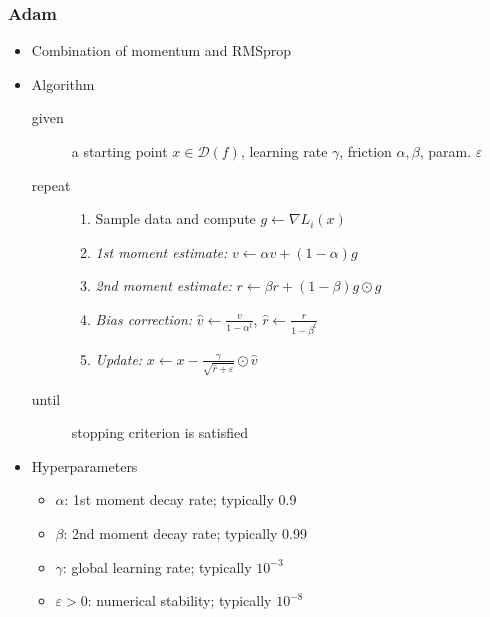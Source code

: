 \subsubsection*{Adam}
\begin{itemize}
    \item Combination of momentum and RMSprop
    \item Algorithm
    \begin{description}
        \item[given] a starting point $x\in\mathcal{D}(f)$, learning rate $\gamma$, friction $\alpha,\beta$, param. $\varepsilon$
        \item[repeat] \phantom{}
        \begin{enumerate}
            \item Sample data and compute $g\leftarrow\nabla L_i(x)$
            \item \textit{1st moment estimate:} $v\leftarrow\alpha v+(1-\alpha)g$
            \item \textit{2nd moment estimate:} $r\leftarrow\beta r+(1-\beta)g\odot g$
            \item \textit{Bias correction:} $\hat{v}\leftarrow\frac{v}{1-\alpha^t}$, $\hat{r}\leftarrow\frac{r}{1-\beta^t}$
            \item \textit{Update:} $x\leftarrow x-\frac{\gamma}{\sqrt{\hat{r}+\varepsilon}}\odot\hat{v}$
        \end{enumerate}
        \item[until] stopping criterion is satisfied
    \end{description}
    \item Hyperparameters
    \begin{itemize}
        \item $\alpha$: 1st moment decay rate; typically 0.9
        \item $\beta$: 2nd moment decay rate; typically 0.99
        \item $\gamma$: global learning rate; typically $10^{-3}$
        \item $\varepsilon>0$: numerical stability; typically $10^{-8}$
    \end{itemize}
\end{itemize}


